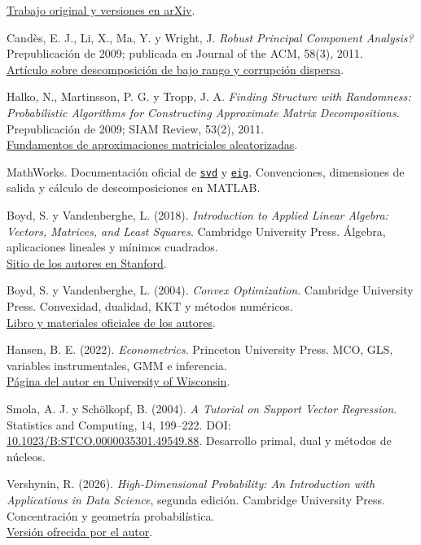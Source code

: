 \documentclass[11pt,a4paper]{article}
\theoremstyle{definition}
\begin{document}
\begin{enumerate}[label={[\arabic*]},itemsep=3pt]
\href{https://arxiv.org/abs/1802.03426}{Trabajo original y versiones en arXiv}.
\item Candès, E. J., Li, X., Ma, Y. y Wright, J. \textit{Robust Principal Component Analysis?} Prepublicación de 2009; publicada en Journal of the ACM, 58(3), 2011.\\
\href{https://arxiv.org/abs/0912.3599}{Artículo sobre descomposición de bajo rango y corrupción dispersa}.
\item Halko, N., Martinsson, P. G. y Tropp, J. A. \textit{Finding Structure with Randomness: Probabilistic Algorithms for Constructing Approximate Matrix Decompositions}. Prepublicación de 2009; SIAM Review, 53(2), 2011.\\
\href{https://arxiv.org/abs/0909.4061}{Fundamentos de aproximaciones matriciales aleatorizadas}.
\item MathWorks. Documentación oficial de \href{https://www.mathworks.com/help/matlab/ref/double.svd.html}{\texttt{svd}} y \href{https://www.mathworks.com/help/matlab/ref/eig.html}{\texttt{eig}}. Convenciones, dimensiones de salida y cálculo de descomposiciones en MATLAB.

\item Boyd, S. y Vandenberghe, L. (2018). \textit{Introduction to Applied Linear Algebra: Vectors, Matrices, and Least Squares}. Cambridge University Press. Álgebra, aplicaciones lineales y mínimos cuadrados.\\
\href{https://web.stanford.edu/~boyd/vmls/}{Sitio de los autores en Stanford}.
\item Boyd, S. y Vandenberghe, L. (2004). \textit{Convex Optimization}. Cambridge University Press. Convexidad, dualidad, KKT y métodos numéricos.\\
\href{https://web.stanford.edu/~boyd/cvxbook/}{Libro y materiales oficiales de los autores}.
\item Hansen, B. E. (2022). \textit{Econometrics}. Princeton University Press. MCO, GLS, variables instrumentales, GMM e inferencia.\\
\href{https://users.ssc.wisc.edu/~behansen/econometrics/}{Página del autor en University of Wisconsin}.
\item Smola, A. J. y Schölkopf, B. (2004). \textit{A Tutorial on Support Vector Regression}. Statistics and Computing, 14, 199--222. DOI: \href{https://doi.org/10.1023/B:STCO.0000035301.49549.88}{10.1023/B:STCO.0000035301.49549.88}. Desarrollo primal, dual y métodos de núcleos.
\item Vershynin, R. (2026). \textit{High-Dimensional Probability: An Introduction with Applications in Data Science}, segunda edición. Cambridge University Press. Concentración y geometría probabilística.\\
\href{https://www.math.uci.edu/~rvershyn/papers/HDP-book/HDP-2.pdf}{Versión ofrecida por el autor}.
\end{enumerate}\endgroup
\end{document}
